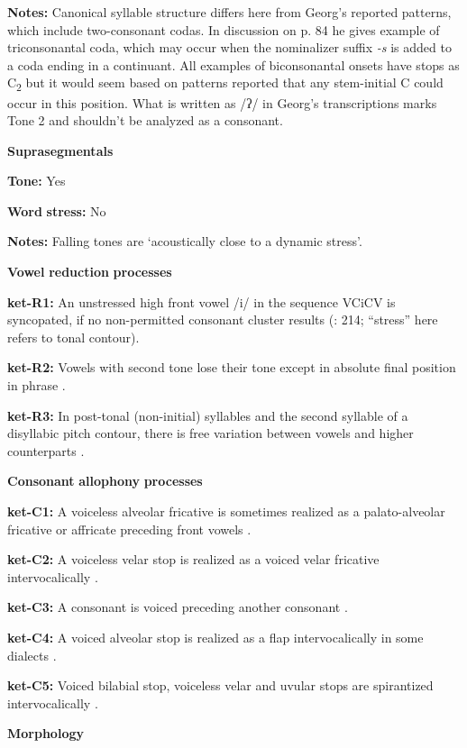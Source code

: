 \begin{styleBody}
\textbf{Notes:} Canonical syllable structure differs here from Georg’s reported patterns, which include two-consonant codas. In discussion on p. 84 he gives example of triconsonantal coda, which may occur when the nominalizer suffix \textit{{}-s} is added to a coda ending in a continuant. All examples of biconsonantal onsets have stops as C\textsubscript{2} but it would seem based on patterns reported that any stem-initial C could occur in this position. What is written as /ʔ/ in Georg’s transcriptions marks Tone 2 and shouldn’t be analyzed as a consonant.

\textbf{Suprasegmentals}

\textbf{Tone:} Yes

\textbf{Word} \textbf{stress:} No

\textbf{Notes:} Falling tones are ‘acoustically close to a dynamic stress’.

\textbf{Vowel} \textbf{reduction} \textbf{processes}

\textbf{ket-R1:} An unstressed high front vowel /i/ in the sequence VCiCV is syncopated, if no non-permitted consonant cluster results (\citealt{Georg2007}: 214; “stress” here refers to tonal contour).

\textbf{ket-R2:} Vowels with second tone lose their tone except in absolute final position in phrase \citep[15-16]{Vajda2000}.

\textbf{ket-R3:} In post-tonal (non-initial) syllables and the second syllable of a disyllabic pitch contour, there is free variation between vowels and higher counterparts \citep[11]{Vajda2000}.

\textbf{Consonant} \textbf{allophony} \textbf{processes}

\textbf{ket-C1:} A voiceless alveolar fricative is sometimes realized as a palato-alveolar fricative or affricate preceding front vowels \citep[78]{Georg2007}.

\textbf{ket-C2:} A voiceless velar stop is realized as a voiced velar fricative intervocalically \citep[75]{Georg2007}.

\textbf{ket-C3:} A consonant is voiced preceding another consonant \citep[75]{Georg2007}.

\textbf{ket-C4:} A voiced alveolar stop is realized as a flap intervocalically in some dialects \citep[76]{Georg2007}.

\textbf{ket-C5:} Voiced bilabial stop, voiceless velar and uvular stops are spirantized intervocalically \citep[75-8]{Georg2007}.

\textbf{Morphology}


\end{styleBody}
